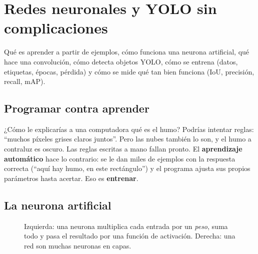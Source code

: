 \chapter{Redes neuronales y YOLO sin complicaciones}

\begin{enpocas}
Qué es aprender a partir de ejemplos, cómo funciona una neurona artificial, qué hace una convolución,
cómo detecta objetos YOLO, cómo se entrena (datos, etiquetas, épocas, pérdida) y cómo se mide qué tan
bien funciona (IoU, precisión, recall, mAP).
\end{enpocas}

\section{Programar contra aprender}

¿Cómo le explicarías a una computadora qué es el humo? Podrías intentar reglas: ``muchos píxeles
grises claros juntos''. Pero las nubes también lo son, y el humo a contraluz es oscuro. Las reglas
escritas a mano fallan pronto. El \textbf{aprendizaje automático} hace lo contrario: se le dan miles de
ejemplos con la respuesta correcta (``aquí hay humo, en este rectángulo'') y el programa ajusta sus
propios parámetros hasta acertar. Eso es \textbf{entrenar}.

\section{La neurona artificial}

\begin{figure}[H]
\centering
{}
\caption{Izquierda: una neurona multiplica cada entrada por un \emph{peso}, suma todo y pasa el
resultado por una función de activación. Derecha: una red son muchas neuronas en capas.}
\end{figure}

